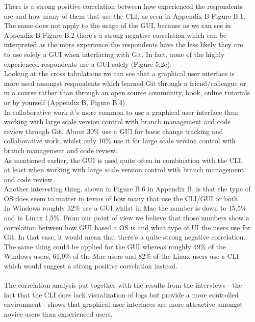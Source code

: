 \documentclass[a4paper,oneside]{bth} %
\begin{document}
				There is a strong positive correlation between how experienced the respondents are and how many of them that use the CLI, as seen in Appendix B Figure B.1.
				The same does not apply to the usage of the GUI, because as we can see in Appendix B Figure B.2 there's a strong negative correlation which can be interpreted as the more experience the respondents have the less likely they are to use solely a GUI when interfacing with Git. In fact, none of the highly experienced respondents use a GUI solely (Figure 5.2c).
				\\
				Looking at the cross tabulations we can see that a graphical user interface is more used amongst respondents which learned Git through a friend/colleague or in a course rather than through an open source community, book, online tutorials or by yourself (Appendix B, Figure B.4).\\
				In collaborative work it's more common to use a graphical user interface than working with large scale version control with branch management and code review through Git. About 30\% use a GUI for basic change tracking and collaborative work, whilst only 10\% use it for large scale version control with branch management and code review.\\
				As mentioned earlier, the GUI is used quite often in combination with the CLI, at least when working with large scale version control with branch management and code review.\\
				Another interesting thing, shown in Figure B.6 in Appendix B, is that the type of OS does seem to matter in terms of how many that use the CLI/GUI or both.\\
				In Windows roughly 32\% use a GUI whilst in Mac the number is down to 15,5\% and in Linux 1,5\%.
				From our point of view we believe that those numbers show a correlation between how GUI based a OS is and what type of UI the users use for Git. In that case, it would mean that there's a quite strong negative correlation.
				The same thing could be applied for the GUI whereas roughly 49\% of the Windows users, 61,9\% of the Mac users and 82\% of the Linux users use a CLI which would suggest a strong positive correlation instead.\\\\			
				The correlation analysis put together with the results from the interviews - the fact that the CLI does lack visualization of logs but provide a more controlled environment - shows that graphical user interfaces are more attractive amongst novice users than experienced users.
\end{document}

